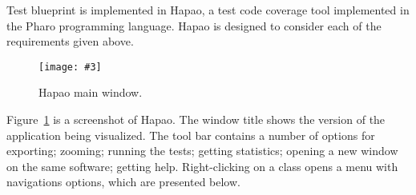 \documentclass{sig-alternate}
\newcommand{\fig}[4]{
	\begin{figure}[#1]
		\centering
		\texttt{[image: \#3]}
		\caption{\label{fig:#3}#4}
	\end{figure}}
\newcommand{\seclabel}[1]{\label{sec:#1}}
\newcommand{\figref}[1]{Figure~\ref{fig:#1}}
\newcommand{\hapao}{Hapao\xspace}
\begin{document}
Test blueprint is implemented in Hapao, a test code coverage tool implemented in the Pharo programming language. \hapao is designed to consider each of the requirements given above. 

\fig{}{0.37}{Hapao.png}{Hapao main window.}

\figref{Hapao.png} is a screenshot of Hapao. The window title shows the version of the application being visualized. The tool bar contains a number of options for exporting; zooming; running the tests; getting statistics; opening a new window on the same software; getting help. Right-clicking on a class opens a menu with navigations options, which are presented below. 



%




%
\end{document}

